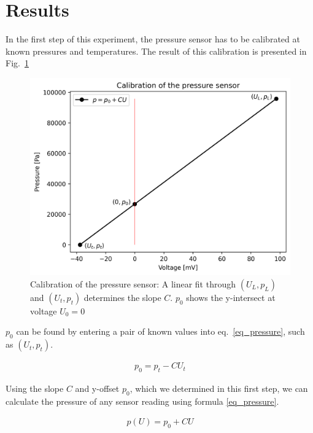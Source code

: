 \section{Results}\label{sec_results}

    In the first step of this experiment, the pressure sensor has to be calibrated at known pressures and temperatures.
    The result of this calibration is presented in Fig.~\ref{fig_calibration}

    \begin{figure}[H]
        \centering
        \includegraphics[]{src/images/calibration.png}
        \caption{Calibration of the pressure sensor: A linear fit through $(U_L,p_L)$ and $(U_t,p_t)$ determines the slope $C$. $p_0$ shows the y-intersect at voltage $U_0 = 0$}
        \label{fig_calibration}
    \end{figure}

    $p_0$ can be found by entering a pair of known values into eq.~\ref{eq_pressure}, such as $(U_t,p_t)$. %

    \begin{align}
        p_0 = p_t - C U_t \label{eq_p0}
    \end{align}

    Using the slope $C$ and y-offset $p_0$, which we determined in this first step, we can calculate the pressure
    of any sensor reading using formula \ref{eq_pressure}.

    \begin{align}
        p(U) = p_0 + CU \label{eq_pressure}
    \end{align}

